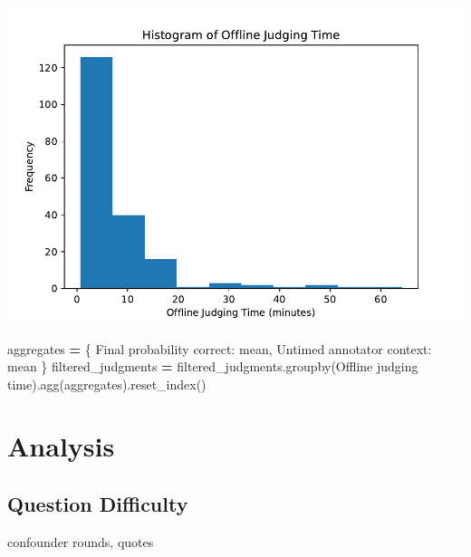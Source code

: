 \documentclass[
]{article}
\newenvironment{Shaded}{\begin{snugshade}}{\end{snugshade}}
\newcommand{\NormalTok}[1]{#1}
\newcommand{\OperatorTok}[1]{\textcolor[rgb]{0.81,0.36,0.00}{\textbf{#1}}}
\newcommand{\StringTok}[1]{\textcolor[rgb]{0.31,0.60,0.02}{#1}}
\begin{document}
\includegraphics{debate-2309_files/figure-latex/TODO offline judging-1.pdf}

\begin{Shaded}
\begin{Highlighting}[]

\NormalTok{aggregates }\OperatorTok{=}\NormalTok{ \{}
    \StringTok{\textquotesingle{}Final probability correct\textquotesingle{}}\NormalTok{: }\StringTok{\textquotesingle{}mean\textquotesingle{}}\NormalTok{,}
    \StringTok{\textquotesingle{}Untimed annotator context\textquotesingle{}}\NormalTok{: }\StringTok{\textquotesingle{}mean\textquotesingle{}}
\NormalTok{\}}
\NormalTok{filtered\_judgments }\OperatorTok{=}\NormalTok{ filtered\_judgments.groupby(}\StringTok{\textquotesingle{}Offline judging time\textquotesingle{}}\NormalTok{).agg(aggregates).reset\_index()}
\end{Highlighting}
\end{Shaded}

\section{Analysis}\label{analysis}

\subsection{Question Difficulty}\label{question-difficulty}

confounder rounds, quotes
\end{document}
